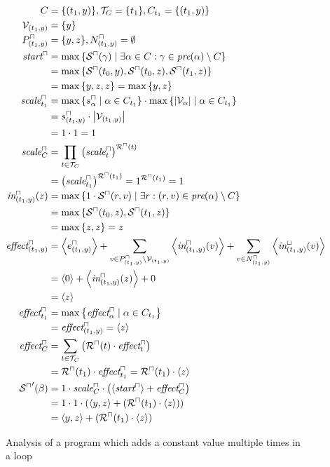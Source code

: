 \begin{figure}
\begin{align*}
  C &= \lbrace (t_1,y) \rbrace, \mathcal{T}_C = \lbrace t_1 \rbrace, C_{t_1} = \lbrace (t_1,y) \rbrace \\
  \mathcal{V}_{(t_1,y)} &= \lbrace y \rbrace \\
  P^\sqcap_{(t_1,y)} &= \lbrace y,z \rbrace, N^\sqcap_{(t_1,y)} = \emptyset \\
  \emph{start}^\sqcap &= \max \left\lbrace {\mathcal{S}^\sqcap}(\gamma) \mid \exists \alpha \in C: \gamma \in \emph{pre}(\alpha) \setminus C \right\rbrace \\
  &= \max \left\lbrace {\mathcal{S}^\sqcap}(t_0,y), {\mathcal{S}^\sqcap}(t_0,z), {\mathcal{S}^\sqcap}(t_1,z) \right\rbrace \\
  &= \max \left\lbrace y,z,z \right\rbrace = \max \left\lbrace y,z \right\rbrace \\
  \emph{scale}^\sqcap_{t_1} &= \max \left\lbrace s^\sqcap_\alpha \mid \alpha \in C_{t_1} \right\rbrace \cdot \max \left\lbrace \left|\mathcal{V}_\alpha\right| \mid \alpha \in C_{t_1} \right\rbrace \\
  &= s^\sqcap_{(t_1,y)} \cdot \left|\mathcal{V}_{(t_1,y)}\right| \\
  &= 1 \cdot 1 = 1 \\
  \emph{scale}^\sqcap_C &= \prod_{t \in \mathcal{T}_C} \left( \emph{scale}^\sqcap_t \right) ^{{\mathcal{R}^\sqcap}(t)} \\
  &= \left( \emph{scale}^\sqcap_{t_1} \right) ^{{\mathcal{R}^\sqcap}(t_1)} = 1^{{\mathcal{R}^\sqcap}(t_1)} = 1 \\
  \emph{in}^\sqcap_{(t_1,y)}(z) &= \max \left\lbrace 1 \cdot {\mathcal{S}^\sqcap}(r, v) \mid \exists r: (r, v) \in \emph{pre}(\alpha) \setminus C \right\rbrace \\
  &= \max \left\lbrace {\mathcal{S}^\sqcap}(t_0, z), {\mathcal{S}^\sqcap}(t_1, z) \right\rbrace \\
  &= \max \left\lbrace z,z \right\rbrace = z \\
  \emph{effect}^\sqcap_{(t_1,y)} &= \left\langle e^{\sqcap}_{(t_1,y)} \right\rangle + \sum_{v \in P_{(t_1,y)}^\sqcap \setminus \mathcal{V}_{(t_1,y)}} \left\langle \emph{in}^\sqcap_{(t_1,y)}(v) \right\rangle + \sum_{v \in N_{(t_1,y)}^\sqcap} \left\langle \emph{in}^\sqcup_{(t_1,y)}(v) \right\rangle \\
  &= \left\langle 0 \right\rangle + \left\langle \emph{in}^\sqcap_{(t_1,y)}(z) \right\rangle + 0 \\
  &= \left\langle z \right\rangle \\
  \emph{effect}^\sqcap_{t_1} &= \max \left\lbrace \emph{effect}^\sqcap_\alpha \mid \alpha \in C_{t_1}  \right\rbrace \\
  &= \emph{effect}^\sqcap_{(t_1,y)} = \left\langle z \right\rangle \\
  \emph{effect}^\sqcap_C &= \sum_{t \in \mathcal{T}_C} \left( {\mathcal{R}^\sqcap}(t) \cdot \emph{effect}^\sqcap_t \right) \\
  &= {\mathcal{R}^\sqcap}(t_1) \cdot \emph{effect}^\sqcap_{t_1} = {\mathcal{R}^\sqcap}(t_1) \cdot \left\langle z \right\rangle \\
  {\mathcal{S}^\sqcap}'(\beta) &= 1 \cdot \emph{scale}^\sqcap_C \cdot \left( \left\langle \emph{start}^\sqcap \right\rangle + \emph{effect}^\sqcap_C \right) \\
  &= 1 \cdot 1 \cdot \left( \left\langle y,z \right\rangle + \left( {\mathcal{R}^\sqcap}(t_1) \cdot \left\langle z \right\rangle \right) \right) \\
  &= \left\langle y,z \right\rangle + \left( {\mathcal{R}^\sqcap}(t_1) \cdot \left\langle z \right\rangle \right)
\end{align*}

\caption{Analysis of a program which adds a constant value multiple times in a loop}
\label{fig:additive_loop}
\end{figure}

